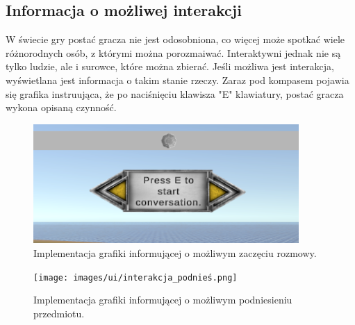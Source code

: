 \subsection{Informacja o możliwej interakcji}
W świecie gry postać gracza nie jest odosobniona, co więcej może spotkać wiele różnorodnych osób, z którymi można porozmaiwać. Interaktywni
jednak nie są tylko ludzie, ale i surowce, które można zbierać. Jeśli możliwa jest interakcja,  wyświetlana jest informacja o takim stanie
 rzeczy. Zaraz pod kompasem pojawia się grafika instruująca, że po naciśnięciu klawisza "E" klawiatury, postać gracza wykona opisaną czynność.
 \begin{figure}[htbp]
    \centering
    \includegraphics[width=0.9\textwidth]{images/ui/interakcja_rozmowa.png}
    \caption{Implementacja grafiki informującej o możliwym zaczęciu rozmowy.}\label{fig:rozmow}
\end{figure}
\begin{figure}[htbp]
    \centering
    \texttt{[image: images/ui/interakcja\_podnieś.png]}
    \caption{Implementacja grafiki informującej o możliwym podniesieniu przedmiotu.}\label{fig:przedmio}
\end{figure}

